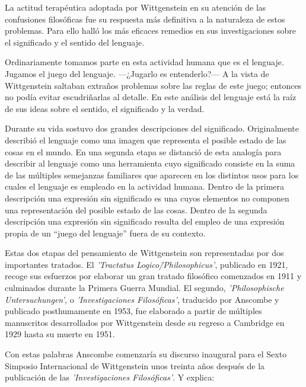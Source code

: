 La actitud terapéutica adoptada por Wittgenstein en su atención de las
confusiones filosóficas fue su respuesta más definitiva a la naturaleza de estos
problemas. Para ello halló los más eficaces remedios en sus investigaciones
sobre el significado y el sentido del lenguaje.

Ordinariamente tomamos parte en esta actividad humana que es el lenguaje.
Jugamos el juego del lenguaje. ---¿Jugarlo es entenderlo?--- A la vista de
Wittgenstein saltaban extraños problemas sobre las reglas de este juego;
entonces no podía evitar escudriñarlas al
detalle.\autocite[cf.~][loc.7099]{monk1991duty} En este análisis del lenguaje está la
raíz de sus ideas sobre el sentido, el significado y la verdad.

Durante su vida sostuvo dos grandes descripciones del significado. Originalmente
describió el lenguaje como una imagen que representa el posible estado de las
cosas en el mundo. En una segunda etapa se distanció de esta analogía para
describir al lenguaje como una herramienta cuyo significado consiste en la suma
de las múltiples semejanzas familiares que aparecen en los distintos usos para
los cuales el lenguaje es empleado en la actividad humana. Dentro de la primera
descripción una expresión sin significado es una cuyos elementos no componen una
representación del posible estado de las cosas. Dentro de la segunda descripción
una expresión sin significado resulta del empleo de una expresión propia de un
``juego del lenguaje'' fuera de su contexto.

Estas dos etapas del pensamiento de Wittgenstein son representadas por dos
importantes tratados. El \emph{'Tractatus Logico\=/Philosophicus'}, publicado en
1921, recoge sus esfuerzos por elaborar un gran tratado filosófico comenzados en
1911 y culminados durante la Primera Guerra Mundial. El segundo,
\emph{'Philosophische Untersuchungen'}, o \emph{'Investigaciones Filosóficas'},
traducido por Anscombe y publicado posthumamente en 1953, fue elaborado a partir
de múltiples manuscritos desarrollados por Wittgenstein desde su regreso a
Cambridge en 1929 hasta su muerte en 1951.

\autocite[p.~181]{twocuts} 
Con estas palabras Anscombe comenzaría su discurso inaugural para el Sexto
Simposio Internacional de Wittgenstein unos treinta años después de la
publicación de las \emph{'Investigaciones Filosóficas'}. Y explica:
\autocite[p.~181]{twocuts}

